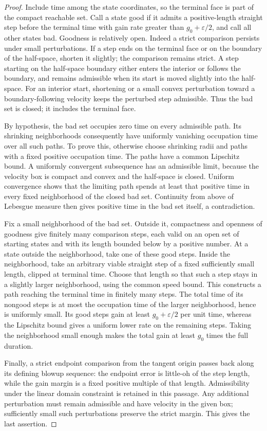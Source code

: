 \begin{proof}
Include time among the state coordinates, so the terminal
face is part of the compact reachable set.  Call a state good
if it admits a positive-length straight step before the
terminal time with gain rate greater than
$g_0+\varepsilon/2$, and call all other states bad.  Goodness
is relatively open.  Indeed a strict comparison persists
under small perturbations.  If a step ends on the terminal
face or on the boundary of the half-space, shorten it
slightly; the comparison remains strict.  A step starting
on the half-space boundary either enters the interior or
follows the boundary, and remains admissible when its start
is moved slightly into the half-space.  For an interior
start, shortening or a small convex perturbation toward a
boundary-following velocity keeps the perturbed step
admissible.  Thus the bad set is closed; it includes the
terminal face.

By hypothesis, the bad set occupies zero time on every
admissible path.  Its shrinking neighborhoods consequently
have uniformly vanishing occupation time over all such
paths.  To prove this, otherwise choose shrinking radii and
paths with a fixed positive occupation time.  The paths have
a common Lipschitz bound.  A uniformly convergent subsequence
has an admissible limit, because the velocity box is compact
and convex and the half-space is closed.  Uniform convergence
shows that the limiting path spends at least that positive
time in every fixed neighborhood of the closed bad set.
Continuity from above of Lebesgue measure then gives positive
time in the bad set itself, a contradiction.

Fix a small neighborhood of the bad set.  Outside it, compactness
and openness of goodness give finitely many comparison steps,
each valid on an open set of starting states and with its length
bounded below by a positive number.  At a state outside the
neighborhood, take one of these good steps.  Inside the
neighborhood, take an arbitrary viable straight step of a
fixed sufficiently small length, clipped at terminal time.
Choose that length so that such a step stays in a slightly
larger neighborhood, using the common speed bound.  This
constructs a path reaching the terminal time in finitely many
steps.  The total time of its nongood steps is at most the
occupation time of the larger neighborhood, hence is
uniformly small.  Its good steps gain at least
$g_0+\varepsilon/2$ per unit time, whereas the Lipschitz
bound gives a uniform lower rate on the remaining steps.
Taking the neighborhood small enough makes the total gain
at least $g_0$ times the full duration.

Finally, a strict endpoint comparison from the tangent origin
passes back along its defining blowup sequence: the endpoint error
is little-oh of the step length, while the gain margin is
a fixed positive multiple of that length.  Admissibility under
the linear domain constraint is retained in this passage.
Any additional perturbation must remain admissible and have
velocity in the given box; sufficiently small such perturbations
preserve the strict margin.  This gives the last assertion.
\end{proof}
